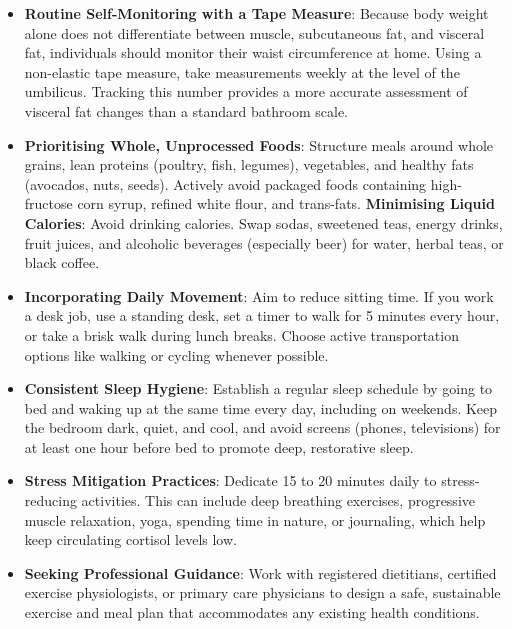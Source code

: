 \begin{itemize}
    \item \textbf{Routine Self-Monitoring with a Tape Measure}: Because body weight alone does not differentiate between muscle, subcutaneous fat, and visceral fat, individuals should monitor their waist circumference at home. Using a non-elastic tape measure, take measurements weekly at the level of the umbilicus. Tracking this number provides a more accurate assessment of visceral fat changes than a standard bathroom scale.
    \item \textbf{Prioritising Whole, Unprocessed Foods}: Structure meals around whole grains, lean proteins (poultry, fish, legumes), vegetables, and healthy fats (avocados, nuts, seeds). Actively avoid packaged foods containing high-fructose corn syrup, refined white flour, and trans-fats.
    \textbf{Minimising Liquid Calories}: Avoid drinking calories. Swap sodas, sweetened teas, energy drinks, fruit juices, and alcoholic beverages (especially beer) for water, herbal teas, or black coffee.
    \item \textbf{Incorporating Daily Movement}: Aim to reduce sitting time. If you work a desk job, use a standing desk, set a timer to walk for 5 minutes every hour, or take a brisk walk during lunch breaks. Choose active transportation options like walking or cycling whenever possible.
    \item \textbf{Consistent Sleep Hygiene}: Establish a regular sleep schedule by going to bed and waking up at the same time every day, including on weekends. Keep the bedroom dark, quiet, and cool, and avoid screens (phones, televisions) for at least one hour before bed to promote deep, restorative sleep.
    \item \textbf{Stress Mitigation Practices}: Dedicate 15 to 20 minutes daily to stress-reducing activities. This can include deep breathing exercises, progressive muscle relaxation, yoga, spending time in nature, or journaling, which help keep circulating cortisol levels low.
    \item \textbf{Seeking Professional Guidance}: Work with registered dietitians, certified exercise physiologists, or primary care physicians to design a safe, sustainable exercise and meal plan that accommodates any existing health conditions.
\end{itemize}

